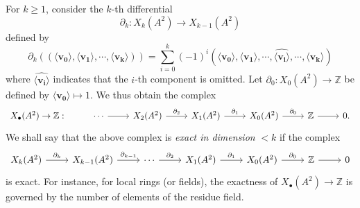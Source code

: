 \documentclass[11pt]{amsart}
\theoremstyle{definition}
\theoremstyle{plain}
\theoremstyle{definition}
\numberwithin{equation}{section}
\newcommand{\z}{\mathbb{Z}}
\newcommand{\lan}{\langle}
\newcommand{\ran}{\rangle}
\begin{document}
	For $k\geq 1$, consider the $k$-th differential
	\[
	\partial_k:X_k(A^2)\to X_{k-1}(A^2)
	\]
	defined by
	\[
	\partial_k((\lan\pmb{v_0}\ran,\lan\pmb{v_1}\ran,\cdots,\lan\pmb{v_k}\ran))=\sum^k_{i=0}(-1)^i(\lan\pmb{v_0}\ran,\lan\pmb{v_1}\ran,\cdots,\hat{\lan\pmb{v_i}\ran},\cdots,\lan\pmb{v_k}\ran)
	\]
	where $\hat{\lan\pmb{v_i}\ran}$ indicates that the $i$-th component is omitted. Let $\partial_0:X_0(A^2)\to\z$ be defined by $\lan\pmb{v_0}\ran\mapsto 1$. We thus obtain the complex
	\[
	\begin{tikzcd}
		X_{\bullet}(A^2)\to\z:& \cdots \ar[r] & X_2(A^2)\ar[r,"\partial_2"] & X_1(A^2)\ar[r,"\partial_1"] & X_0(A^2) \ar[r,"\partial_0"] & \z \ar[r] & 0.
	\end{tikzcd}
	\]
	We shall say that the above complex is \textit{exact in dimension} $<k$ if the complex
	\[
	\begin{tikzcd}
		X_k(A^2)\ar[r,"\partial_k"] & X_{k-1}(A^2)\ar[r,"\partial_{k-1}"] & \cdots \ar[r,"\partial_2"] & X_1(A^2)\ar[r,"\partial_1"] & X_0(A^2) \ar[r,"\partial_0"] & \z \ar[r] & 0
	\end{tikzcd}
	\]
	is exact. For instance, for local rings (or fields), the exactness of $X_{\bullet}(A^2)\to\z$ is governed by the number of elements of the residue field.
	
\end{document}
